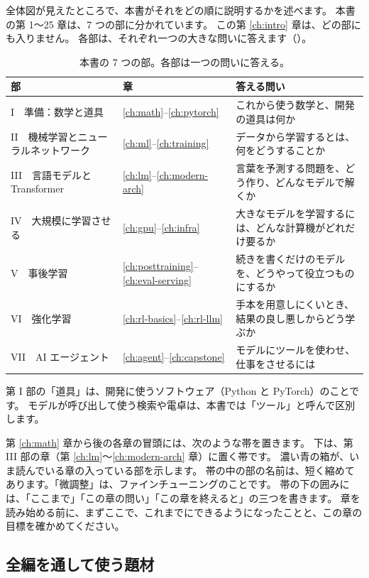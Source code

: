 全体図が見えたところで、本書がそれをどの順に説明するかを述べます。
本書の第 1〜25 章は、7 つの部に分かれています。
この第 \ref{ch:intro} 章は、どの部にも入りません。
各部は、それぞれ一つの大きな問いに答えます（）。

\begin{table}[htbp]
\centering
\caption{本書の 7 つの部。各部は一つの問いに答える。}
\label{tab:intro-parts}
\small
\begin{tabularx}{\linewidth}{@{}llX@{}}
\toprule
部 & 章 & 答える問い \\
\midrule
I\ \ 準備：数学と道具 & \ref{ch:math}--\ref{ch:pytorch} & これから使う数学と、開発の道具は何か \\
II\ \ 機械学習とニューラルネットワーク & \ref{ch:ml}--\ref{ch:training} & データから学習するとは、何をどうすることか \\
III\ \ 言語モデルと Transformer & \ref{ch:lm}--\ref{ch:modern-arch} & 言葉を予測する問題を、どう作り、どんなモデルで解くか \\
IV\ \ 大規模に学習させる & \ref{ch:gpu}--\ref{ch:infra} & 大きなモデルを学習するには、どんな計算機がどれだけ要るか \\
V\ \ 事後学習 & \ref{ch:posttraining}--\ref{ch:eval-serving} & 続きを書くだけのモデルを、どうやって役立つものにするか \\
VI\ \ 強化学習 & \ref{ch:rl-basics}--\ref{ch:rl-llm} & 手本を用意しにくいとき、結果の良し悪しからどう学ぶか \\
VII\ \ AI エージェント & \ref{ch:agent}--\ref{ch:capstone} & モデルにツールを使わせ、仕事をさせるには \\
\bottomrule
\end{tabularx}
\end{table}

第 I 部の「道具」は、開発に使うソフトウェア（Python と PyTorch）のことです。
モデルが呼び出して使う検索や電卓は、本書では「ツール」と呼んで区別します。

第 \ref{ch:math} 章から後の各章の冒頭には、次のような帯を置きます。
下は、第 III 部の章（第 \ref{ch:lm}〜\ref{ch:modern-arch} 章）に置く帯です。
濃い青の箱が、いま読んでいる章の入っている部を示します。
帯の中の部の名前は、短く縮めてあります。「微調整」は、ファインチューニングのことです。
帯の下の囲みには、「ここまで」「この章の問い」「この章を終えると」の三つを書きます。
章を読み始める前に、まずここで、これまでにできるようになったことと、この章の目標を確かめてください。

\subsection*{全編を通して使う題材}

